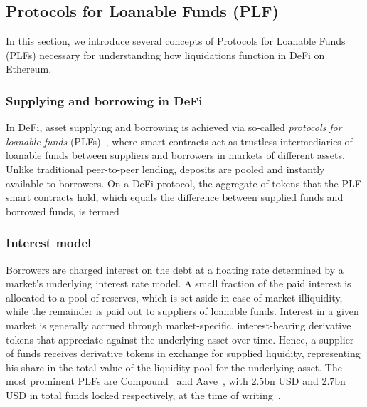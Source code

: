 \subsection{Protocols for Loanable Funds (PLF)}
\label{sec:5b:plfs}
In this section, we introduce several concepts of Protocols for Loanable Funds (PLFs) necessary for understanding how liquidations function in DeFi on Ethereum.

\subsubsection{Supplying and borrowing in DeFi}
In DeFi, asset supplying and borrowing is achieved via so-called \textit{protocols for loanable funds} (PLFs)~\cite{10.1145/3419614.3423254}, where smart contracts act as trustless intermediaries of loanable funds between suppliers and borrowers in markets of different assets.
Unlike traditional peer-to-peer lending, deposits are pooled and instantly available to borrowers.
On a DeFi protocol, the aggregate of tokens that the PLF smart contracts hold, which equals the difference between supplied funds and borrowed funds, is termed ~\cite{defipulse2020}.

\subsubsection{Interest model}
Borrowers are charged interest on the debt at a floating rate determined by a market's underlying interest rate model.
A small fraction of the paid interest is allocated to a pool of reserves, which is set aside in case of market illiquidity, while the remainder is paid out to suppliers of loanable funds.
Interest in a given market is generally accrued through market-specific, interest-bearing derivative tokens that appreciate against the underlying asset over time.
Hence, a supplier of funds receives derivative tokens in exchange for supplied liquidity, representing his share in the total value of the liquidity pool for the underlying asset.
The most prominent PLFs are Compound~\cite{web:compoundfinance} and Aave~\cite{web:aave}, with 2.5bn USD and 2.7bn USD in total funds locked respectively, at the time of writing~\cite{defipulse2020}.

